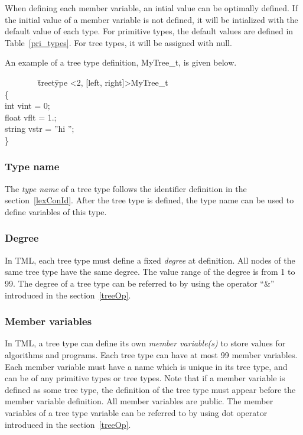\documentclass[12pt,psfig,a4]{article}
\begin{document}
When defining each member variable, an intial value can be optimally defined. If the initial value of a member variable is not defined, it will be intialized with the default value of each type. For primitive types, the default values are defined in Table~\ref{pri_types}. For tree types, it will be assigned with null.

An example of a tree type definition, MyTree\_t, is given below.

\begin{code}
\begin{tabbing}
~~~~~~~~\= treet\=ype \textless2, [left, right]\textgreater MyTree\_t \\
\> \{ \\
\> \>int vint = 0;\\
\> \>float vflt = 1.;\\
\> \>string vstr = ''hi '';\\
\> \}
\end{tabbing}
\end{code}

\subsubsection {Type name}
The \textit{type name} of a tree type follows the identifier definition in the section~\ref{lexConId}. After the tree type is defined, the type name can be used to define variables of this type.

\subsubsection {Degree}
In TML, each tree type must define a fixed \textit{degree} at definition. All nodes of the same tree type have the same degree. The value range of the degree is from 1 to 99. The degree of a tree type can be referred to by using  the operator ``\&'' introduced in the section~\ref{treeOp}.


\subsubsection {Member variables}
In TML, a tree type can define its own \textit{member variable(s)} to store values for algorithms and programs. Each tree type can have at most 99 member variables. Each member variable must have a name which is unique in its tree type, and can be of any primitive types or tree types. Note that if a member variable is defined as some tree type, the definition of the tree type must appear before the member variable definition. All member variables are public. The member variables of a tree type variable can be referred to by using dot operator introduced in the section~\ref{treeOp}.
\end{document}

